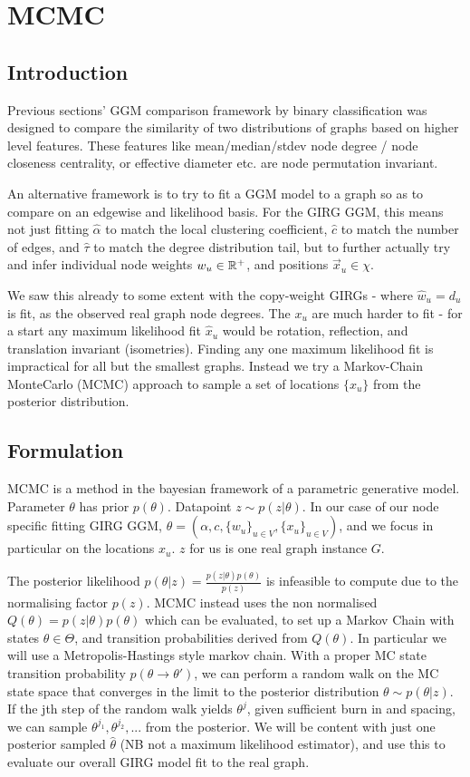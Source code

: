 \chapter{MCMC}
\minitoc
\section{Introduction}
Previous sections' GGM comparison framework by binary classification was designed to compare the similarity of two distributions of graphs based on higher level features. These features like mean/median/stdev node degree / node closeness centrality, or effective diameter etc. are node permutation invariant.

An alternative framework is to try to fit a GGM model to a graph so as to compare on an edgewise and likelihood basis. For the GIRG GGM, this means not just fitting $\hat{\alpha}$ to match the local clustering coefficient, $\hat{c}$ to match the number of edges, and $\hat{\tau}$ to match the degree distribution tail, but to further actually try and infer individual node weights $w_u \in \mathbb{R}^+$, and positions $\vec{x}_u \in \chi$. 

We saw this already to some extent with the copy-weight GIRGs - where $\hat{w}_u = d_u$ is fit, as the observed real graph node degrees. The $x_u$ are much harder to fit - for a start any maximum likelihood fit $\hat{x}_u$ would be rotation, reflection, and translation invariant (isometries). Finding any one maximum likelihood fit is impractical for all but the smallest graphs. Instead we try a Markov-Chain MonteCarlo (MCMC) approach to sample a set of locations $\{x_u\}$ from the posterior distribution.

\section{Formulation}
MCMC is a method in the bayesian framework of a parametric generative model. Parameter $\theta$ has prior $p(\theta)$. Datapoint $z \sim p(z | \theta)$. In our case of our node specific fitting GIRG GGM, $\theta = (\alpha, c, \{w_u\}_{u \in V}, \{x_u\}_{u \in V})$, and we focus in particular on the locations $x_u$. $z$ for us is one real graph instance $G$.

The posterior likelihood $p(\theta | z) = \frac{p(z | \theta) p(\theta)}{p(z)}$ is infeasible to compute due to the normalising factor $p(z)$. MCMC instead uses the non normalised $Q(\theta) = p(z | \theta) p(\theta)$ which can be evaluated, to set up a Markov Chain with states $\theta \in \Theta$, and transition probabilities derived from $Q(\theta)$. In particular we will use a Metropolis-Hastings style markov chain. With a proper MC state transition probability $p(\theta \to \theta')$, we can perform a random walk on the MC state space that converges in the limit to the posterior distribution $\theta \sim p(\theta | z)$. If the jth step of the random walk yields $\theta^j$, given sufficient burn in and spacing, we can sample $\theta^{j_1}, \theta^{j_2}, ...$ from the posterior. We will be content with just one posterior sampled $\hat{\theta}$ (NB not a maximum likelihood estimator), and use this to evaluate our overall GIRG model fit to the real graph.

